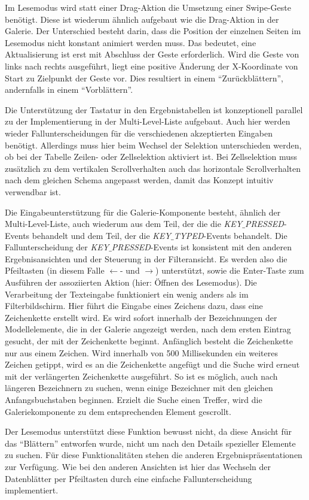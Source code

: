 Im Lesemodus wird statt einer Drag-Aktion die Umsetzung einer Swipe-Geste benötigt. Diese ist wiederum ähnlich aufgebaut wie die Drag-Aktion in der Galerie. Der Unterschied besteht darin, dass die Position der einzelnen Seiten im Lesemodus nicht konstant animiert werden muss.  Das bedeutet, eine Aktualisierung ist erst mit Abschluss der Geste erforderlich. Wird die Geste von links nach rechts ausgeführt, liegt eine positive Änderung der X-Koordinate von Start zu Zielpunkt der Geste vor. Dies resultiert in einem \enquote{Zurückblättern}, andernfalls in einem \enquote{Vorblättern}.\par
Die Unterstützung der Tastatur in den Ergebnistabellen ist konzeptionell parallel zu der Implementierung in der Multi-Level-Liste aufgebaut. Auch hier werden wieder Fallunterscheidungen für die verschiedenen akzeptierten Eingaben benötigt. Allerdings muss hier beim Wechsel der Selektion unterschieden werden, ob bei der Tabelle Zeilen- oder Zellselektion aktiviert ist. Bei Zellselektion muss zusätzlich zu dem vertikalen Scrollverhalten auch das horizontale Scrollverhalten nach dem gleichen Schema angepasst werden, damit das Konzept intuitiv verwendbar ist.\par
Die Eingabeunterstützung für die Galerie-Komponente besteht, ähnlich der Multi-Level-Liste, auch wiederum aus dem Teil, der die die \textit{KEY$\_$PRESSED}-Events behandelt und dem Teil, der die \textit{KEY$\_$TYPED}-Events behandelt. Die Fallunterscheidung der \textit{KEY$\_$PRESSED}-Events ist konsistent mit den anderen Ergebnisansichten und der Steuerung in der Filteransicht. Es werden also die Pfeiltasten (in diesem Falle $\leftarrow$- und $\rightarrow$) unterstützt, sowie die Enter-Taste zum Ausführen der assoziierten Aktion (hier: Öffnen des Lesemodus). Die Verarbeitung der Texteingabe funktioniert ein wenig anders als im Filterbildschirm. Hier führt die Eingabe eines Zeichens dazu, dass eine Zeichenkette erstellt wird. Es wird sofort innerhalb der Bezeichnungen der Modellelemente, die in der Galerie angezeigt werden, nach dem ersten Eintrag gesucht, der mit der Zeichenkette beginnt. Anfänglich besteht die Zeichenkette nur aus einem Zeichen. Wird innerhalb von 500 Millisekunden ein weiteres Zeichen getippt, wird es an die Zeichenkette angefügt und die Suche wird erneut mit der verlängerten Zeichenkette ausgeführt. So ist es möglich, auch nach längeren Bezeichnern zu suchen, wenn einige Bezeichner mit den gleichen Anfangsbuchstaben beginnen. Erzielt die Suche einen Treffer, wird die Galeriekomponente zu dem entsprechenden Element gescrollt.\par
Der Lesemodus unterstützt diese Funktion bewusst nicht, da diese Ansicht für das \enquote{Blättern} entworfen wurde, nicht um nach den Details spezieller Elemente zu suchen. Für diese Funktionalitäten stehen die anderen Ergebnispräsentationen zur Verfügung. Wie bei den anderen Ansichten ist hier das Wechseln der Datenblätter per Pfeiltasten durch eine einfache Fallunterscheidung implementiert. \par